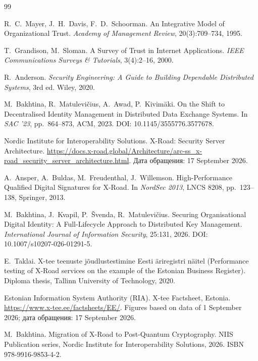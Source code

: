 \documentclass[conference,a4paper]{IEEEtran}
\begin{document}
\begin{thebibliography}{99}

R.~C.~Mayer, J.~H.~Davis, F.~D.~Schoorman.
\newblock An Integrative Model of Organizational Trust.
\newblock \emph{Academy of Management Review}, 20(3):709--734, 1995.

T.~Grandison, M.~Sloman.
\newblock A Survey of Trust in Internet Applications.
\newblock \emph{IEEE Communications Surveys \& Tutorials}, 3(4):2--16, 2000.

R.~Anderson.
\newblock \emph{Security Engineering: A Guide to Building Dependable Distributed Systems}, 3rd ed.
\newblock Wiley, 2020.

M.~Bakhtina, R.~Matulevi\v{c}ius, A.~Awad, P.~Kivim\"{a}ki.
\newblock On the Shift to Decentralised Identity Management in Distributed Data Exchange Systems.
\newblock In \emph{SAC '23}, pp.~864--873, ACM, 2023.
\newblock DOI: 10.1145/3555776.3577678.

Nordic Institute for Interoperability Solutions.
\newblock X-Road: Security Server Architecture.
\newblock \url{https://docs.x-road.global/Architecture/arc-ss_x-road_security_server_architecture.html}.
\newblock Дата обращения: 17 September 2026.

A.~Ansper, A.~Buldas, M.~Freudenthal, J.~Willemson.
\newblock High-Performance Qualified Digital Signatures for X-Road.
\newblock In \emph{NordSec 2013}, LNCS 8208, pp.~123--138, Springer, 2013.

M.~Bakhtina, J.~Kvapil, P.~\v{S}venda, R.~Matulevi\v{c}ius.
\newblock Securing Organisational Digital Identity: A Full-Lifecycle Approach to Distributed Key
Management.
\newblock \emph{International Journal of Information Security}, 25:131, 2026.
\newblock DOI: 10.1007/s10207-026-01291-5.

E.~Taklai.
\newblock X-tee teenuste j\~{o}udlustestimine Eesti \"{a}riregistri n\"{a}itel
(Performance testing of X-Road services on the example of the Estonian Business Register).
\newblock Diploma thesis, Tallinn University of Technology, 2020.

Estonian Information System Authority (RIA).
\newblock X-tee Factsheet, Estonia.
\newblock \url{https://www.x-tee.ee/factsheets/EE/}.
\newblock Figures based on data of 1 September 2026; дата обращения: 17 September 2026.

M.~Bakhtina.
\newblock Migration of X-Road to Post-Quantum Cryptography.
\newblock NIIS Publication series, Nordic Institute for Interoperability Solutions, 2026.
\newblock ISBN 978-9916-9853-4-2.


\end{thebibliography}
\end{document}
